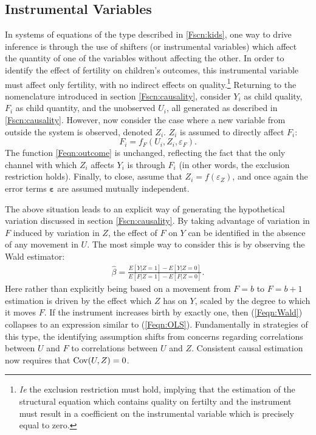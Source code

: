 \subsection{Instrumental Variables}
\label{Fsscn:kidIV}
In systems of equations of the type described in \ref{Fscn:kids}, one way to 
drive inference is through the
use of shifters (or instrumental variables) which affect the quantity of one of
the variables without affecting the other.  In order to identify the effect of 
fertility on children's outcomes, this instrumental variable must affect only 
fertility, with no indirect effects on quality.\footnote{\emph{Ie} the exclusion 
restriction must hold, implying that the estimation of the structural equation 
which contains quality on fertilty and the instrument must result in a 
coefficient on the instrumental variable which is precisely equal to zero.}
Returning to the nomenclature introduced in section \ref{Fscn:causality},
consider $Y_i$ as child quality, $F_i$ as child quantity, and the unobserved
$U_i$, all generated as described in \ref{Fscn:causality}.  However, now consider 
the case where a new variable from outside the system is observed, denoted 
$Z_i$.  $Z_i$ is assumed to directly affect $F_i$:
\[
F_i = f_F(U_i,Z_i,\varepsilon_F).
\]
The function \ref{Feqn:outcome} is unchanged, reflecting the fact that the only
channel with which $Z_i$ affects $Y_i$ is through $F_i$ (in other words, the 
exclusion restriction holds). Finally, to close, assume that 
$Z_i=f(\varepsilon_Z)$, and once again the error terms $\bm{\varepsilon}$ are 
assumed mutually independent.

The above situation leads to an explicit way of generating the hypothetical 
variation discussed in section \ref{Fscn:causality}.  By taking advantage of 
variation in $F$ induced by variation in $Z$, the effect of $F$ on $Y$ can
be identified in the absence of any movement in $U$.  The most simple way to
consider this is by observing the Wald estimator:
\begin{eqnarray}
\label{Feqn:Wald}
\hat\beta = \frac{E[Y|Z=1]-E[Y|Z=0]}{E[F|Z=1]-E[F|Z=0]}.
\end{eqnarray}
Here rather than explicitly being based on a movement from $F=b$ to $F=b+1$
estimation is driven by the effect which $Z$ has on $Y$, scaled by the
degree to which it moves $F$.  If the instrument increases birth by exactly
one, then (\ref{Feqn:Wald}) collapses to an expression similar to 
(\ref{Feqn:OLS}).  Fundamentally in strategies of this type, the identifying
assumption shifts from concerns regarding correlations between $U$ and $F$
to correlations between $U$ and $Z$.  Consistent causal estimation now 
requires that $\mathrm{Cov}(U,Z)=0$.

